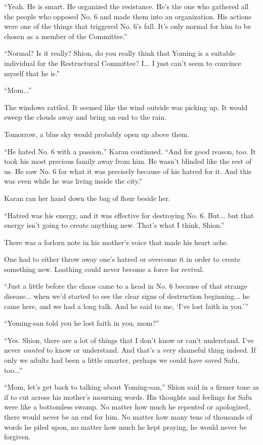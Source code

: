 ``Yeah. He is smart. He organized the resistance. He's the one who
gathered all the people who opposed No. 6 and made them into an
organization. His actions were one of the things that triggered No. 6's
fall. It's only normal for him to be chosen as a member of the
Committee.''

``Normal? Is it really? Shion, do you really think that Yoming is a
suitable individual for the Restructural Committee? I... I just can't
seem to convince myself that he is.''

``Mom...''

The windows rattled. It seemed like the wind outside was picking up. It
would sweep the clouds away and bring an end to the rain.

Tomorrow, a blue sky would probably open up above them.

``He hated No. 6 with a passion,'' Karan continued. ``And for good
reason, too. It took his most precious family away from him. He wasn't
blinded like the rest of us. He saw No. 6 for what it was precisely
because of his hatred for it. And this was even while he was living
inside the city.''

Karan ran her hand down the bag of flour beside her.

``Hatred was his energy, and it was effective for destroying No. 6.
But... but that energy isn't going to create anything new. That's what I
think, Shion.''

There was a forlorn note in his mother's voice that made his heart ache.

One had to either throw away one's hatred or overcome it in order to
create something new. Loathing could never become a force for revival.

``Just a little before the chaos came to a head in No. 6 because of that
strange disease... when we'd started to see the clear signs of
destruction beginning... he came here, and we had a long talk. And he
said to me, `I've lost faith in you.'''

``Yoming-san told you he lost faith in you, mom?''

``Yes. Shion, there are a lot of things that I don't know or can't
understand. I've never \emph{wanted} to know or understand. And that's a very
shameful thing indeed. If only we adults had been a little smarter,
perhaps we could have saved Safu, too...''

``Mom, let's get back to talking about Yoming-san,'' Shion said in a
firmer tone as if to cut across his mother's mourning words. His
thoughts and feelings for Safu were like a bottomless swamp. No matter
how much he repented or apologized, there would never be an end for him.
No matter how many tens of thousands of words he piled upon, no matter
how much he kept praying, he would never be forgiven.

